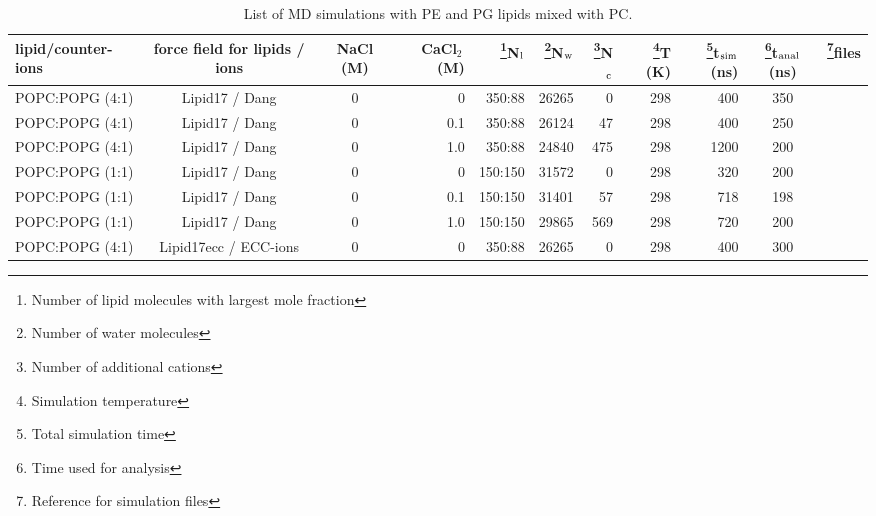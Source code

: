\documentclass[journal=jpcbfk]{achemso}
\begin{document}
  \begin{sidewaystable*}[!p]
  \centering
  \caption{List of MD simulations with PE and PG lipids mixed with PC.
  }\label{systemsMIX2}
  \begin{minipage}[t]{\textwidth}
    \begin{tabular}{l c c r r r r r r c c}
      lipid/counter-ions & force field for lipids / ions & NaCl (M) & CaCl$_2$\,(M) &  \footnote{Number of lipid molecules with largest mole fraction}N$_{\rm l}$   &  \footnote{Number of water molecules}N$_{\rm w}$   & \footnote{Number of additional cations}N$_{\rm c}$  & \footnote{Simulation temperature}T (K)  & \footnote{Total simulation time}t$_{{\rm sim}}$(ns) & \footnote{Time used for analysis}t$_{{\rm anal}}$ (ns) &   \footnote{Reference for simulation files}files\\
      \hline
      POPC:POPG (4:1)        & Lipid17 / Dang \cite{gould18,smith94,dang06}        &0          & 0  & 350:88 & 26265 & 0  &  298  & 400 & 350 & \cite{Lipid17POPCPOPG8020} \\
      POPC:POPG (4:1)        & Lipid17 / Dang \cite{gould18,smith94,dang06}        &0          & 0.1& 350:88 & 26124 & 47 &  298  & 400 & 250 & \cite{Lipid17POPCPOPG8020100mMCaCl} \\
      POPC:POPG (4:1)        & Lipid17 / Dang \cite{gould18,smith94,dang06}        &0          & 1.0& 350:88 & 24840 & 475 &  298  & 1200 & 200 & \cite{Lipid17POPCPOPG80201000mMCaCl} \\
      POPC:POPG (1:1)        & Lipid17 / Dang \cite{gould18,smith94,dang06}        &0          & 0  & 150:150 & 31572 & 0  &  298  & 320 & 200 & \cite{Lipid17POPCPOPG5050} \\
      POPC:POPG (1:1)        & Lipid17 / Dang \cite{gould18,smith94,dang06}        &0          & 0.1& 150:150 & 31401 & 57 &  298  & 718 & 198 & \cite{Lipid17POPCPOPG5050100mMCaCl} \\
      POPC:POPG (1:1)        & Lipid17 / Dang \cite{gould18,smith94,dang06}        &0          & 1.0& 150:150 & 29865 & 569 &  298  & 720 & 200 & \cite{Lipid17POPCPOPG50501000mMCaCl} \\
      \hline
      POPC:POPG (4:1)        & Lipid17ecc / ECC-ions \cite{pluharova14,kohagen16,martinek18}     &0          & 0  & 350:88 & 26265 & 0  &  298  & 400 & 300 & \cite{Lipid17eccPOPCPOPG8020} \\

\end{tabular}
\end{minipage}
\end{sidewaystable*}
\end{document}
